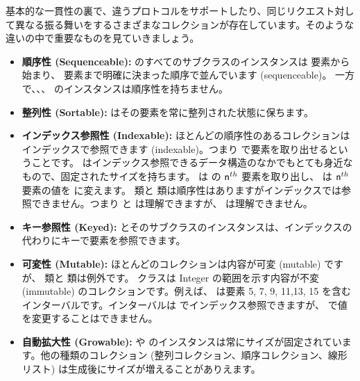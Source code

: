 \documentclass[a4paper,10pt,twoside]{book}
\begin{document}
基本的な一貫性の裏で、違うプロトコルをサポートしたり、同じリクエスト対して異なる振る舞いをするさまざまなコレクションが存在しています。そのような違いの中で重要なものを見ていきましょう。

\begin{itemize}
  \item {\bf 順序性 (Sequenceable):}
   のすべてのサブクラスのインスタンスは  要素から始まり、 要素まで明確に決まった順序で並んでいます (sequenceable)。
  一方で、\mbox{、}\mbox{、} のインスタンスは順序性を持ちません。

  \item {\bf 整列性 (Sortable):}
   はその要素を常に整列された状態に保ちます。

  \item {\bf インデックス参照性 (Indexable):}
        ほとんどの順序性のあるコレクションはインデックスで参照できます (indexable)。つまり  で要素を取り出せるということです。
         はインデックス参照できるデータ構造のなかでもとても身近なもので、固定されたサイズを持ちます。 は  の $\mbox{\ct{n}}^{th}$ 要素を取り出し、 は $\mbox{\ct{n}}^{th}$ 要素の値を  に変えます。
         類と  類は順序性はありますがインデックスでは参照できません。つまり  と  は理解できますが、 は理解できません。

  \item {\bf キー参照性 (Keyed):}
	 とそのサブクラスのインスタンスは、インデックスの代わりにキーで要素を参照できます。

  \item {\bf 可変性 (Mutable):}
        ほとんどのコレクションは内容が可変 (mutable) ですが、 類と  類は例外です。
         クラスは Integer の範囲を示す内容が不変 (immutable) のコレクションです。例えば、 は要素 5, 7, 9, 11,13, 15 を含むインターバルです。インターバルは  でインデックス参照できますが、 で値を変更することはできません。

  \item {\bf 自動拡大性 (Growable):}
          や  のインスタンスは常にサイズが固定されています。他の種類のコレクション (整列コレクション、順序コレクション、線形リスト) は生成後にサイズが増えることがありえます。


\end{itemize}
\end{document}
